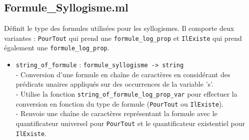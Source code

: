 \documentclass{article}
\begin{document}
\subsection{\textbf{Formule\_Syllogisme.ml}}
Définit le type des formules utilisées pour les syllogismes. Il comporte deux variantes : \texttt{PourTout} qui prend une \texttt{formule\_log\_prop} et \texttt{IlExiste} qui prend également une \texttt{formule\_log\_prop}.
\begin{itemize}
\item
\texttt{string\_of\_formule} : \texttt{formule\_syllogisme -> string}
\\
- Conversion d'une formule en chaîne de caractères en considérant des prédicats unaires appliqués sur des occurrences de la variable 's'.
\\
- Utilise la fonction \texttt{string\_of\_formule\_log\_prop\_var} pour effectuer la conversion en fonction du type de formule (\texttt{PourTout} ou \texttt{IlExiste}).
\\
- Renvoie une chaîne de caractères représentant la formule avec le quantificateur universel pour \texttt{PourTout} et le quantificateur existentiel pour \texttt{IlExiste}.
\end{itemize}
\end{document}

